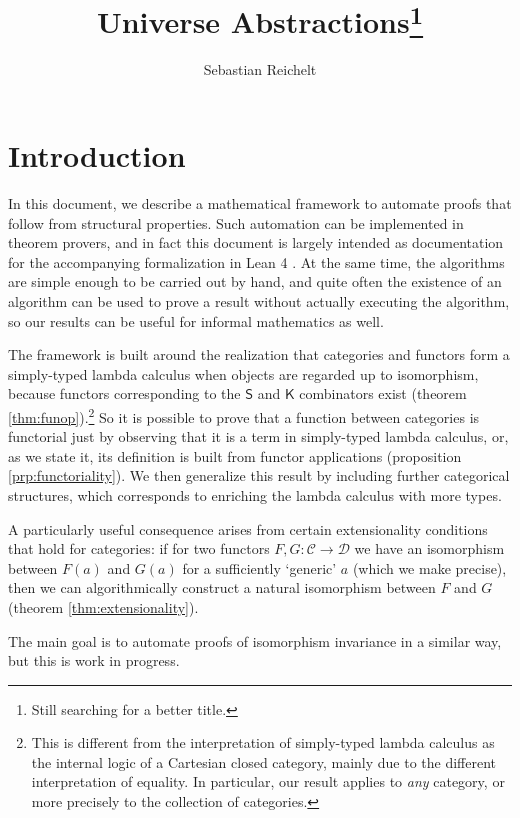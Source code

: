 \documentclass[a4paper]{article}
\title{Universe Abstractions\footnote{Still searching for a better title.}}
\author{Sebastian Reichelt}
\theoremstyle{definition}
\theoremstyle{remark}
\newcommand{\C}{\mathcal{C}}
\newcommand{\D}{\mathcal{D}}
\newcommand{\nm}{\mathsf}
\begin{document}
\maketitle

\section{Introduction}

In this document, we describe a mathematical framework to automate proofs that follow from structural
properties. Such automation can be implemented in theorem provers, and in fact this document is
largely intended as documentation for the accompanying formalization in Lean 4 \cite{lean4}.
At the same time, the algorithms are simple enough to be carried out by hand, and quite often the
existence of an algorithm can be used to prove a result without actually executing the algorithm, so
our results can be useful for informal mathematics as well.

The framework is built around the realization that categories and functors form a simply-typed lambda
calculus \cite{simply-typed-lambda-calculus} when objects are regarded up to isomorphism, because
functors corresponding to the $\nm{S}$ and $\nm{K}$ combinators exist (theorem
\ref{thm:funop}).\footnote{This is different from the interpretation of simply-typed lambda calculus
as the internal logic of a Cartesian closed category, mainly due to the different interpretation of
equality. In particular, our result applies to \emph{any} category, or more precisely to the
collection of categories.}
So it is possible to prove that a function between categories is functorial just by observing that it
is a term in simply-typed lambda calculus, or, as we state it, its definition is built from functor
applications (proposition \ref{prp:functoriality}). We then generalize this result by including
further categorical structures, which corresponds to enriching the lambda calculus with more types.

A particularly useful consequence arises from certain extensionality conditions that hold for
categories: if for two functors $F,G : \C \to \D$ we have an isomorphism between $F(a)$ and $G(a)$
for a sufficiently `generic' $a$ (which we make precise), then we can algorithmically construct a
natural isomorphism between $F$ and $G$ (theorem \ref{thm:extensionality}).

The main goal is to automate proofs of isomorphism invariance in a similar way, but this is work in
progress.
\end{document}
